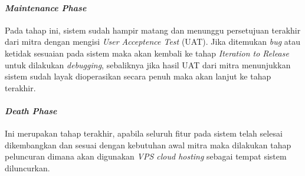     \paragraph{\textit{Maintenance Phase}}

    Pada tahap ini, sistem sudah hampir matang dan menunggu persetujuan terakhir dari mitra dengan mengisi \textit{User Acceptence Test} (UAT). Jika ditemukan \textit{bug} atau ketidak sesuaian pada sistem maka akan kembali ke tahap \textit{Iteration to Release} untuk dilakukan \textit{debugging}, sebaliknya jika hasil UAT dari mitra menunjukkan sistem sudah layak dioperasikan secara penuh maka akan lanjut ke tahap terakhir.


    \paragraph{\textit{Death Phase}}

    Ini merupakan tahap terakhir, apabila seluruh fitur pada sistem telah selesai dikembangkan dan sesuai dengan kebutuhan awal mitra maka dilakukan tahap peluncuran dimana akan digunakan \textit{VPS cloud hosting} sebagai tempat sistem diluncurkan.





